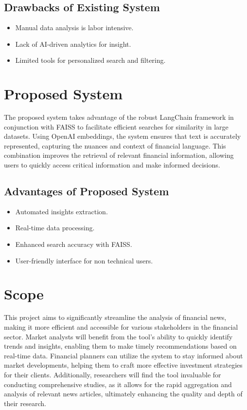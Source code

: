 \documentclass[12pt,a4paper]{report}
\begin{document}
{\subsection{Drawbacks of Existing System}
\begin{itemize}
	\item Manual data analysis is labor intensive.
	\item Lack of AI-driven analytics for insight.
	\item Limited tools for personalized search and filtering.
\end{itemize}
\section{Proposed System}
 The proposed system takes advantage of the robust LangChain framework in conjunction with FAISS to facilitate efficient searches for similarity in large datasets. Using OpenAI embeddings, the system ensures that text is accurately represented, capturing the nuances and context of financial language. This combination improves the retrieval of relevant financial information, allowing users to quickly access critical information and make informed decisions.
\subsection{ Advantages of Proposed System}
\begin{itemize}
	\item Automated insights extraction.
	\item Real-time data processing.
	\item Enhanced search accuracy with FAISS.
	\item User-friendly interface for non technical users. 
	
\end{itemize}
  \section{Scope}
  This project aims to significantly streamline the analysis of financial news, making it more efficient and accessible for various stakeholders in the financial sector. Market analysts will benefit from the tool's ability to quickly identify trends and insights, enabling them to make timely recommendations based on real-time data. Financial planners can utilize the system to stay informed about market developments, helping them to craft more effective investment strategies for their clients. Additionally, researchers will find the tool invaluable for conducting comprehensive studies, as it allows for the rapid aggregation and analysis of relevant news articles, ultimately enhancing the quality and depth of their research.
}
\end{document}
